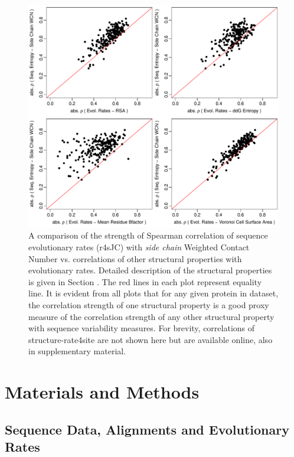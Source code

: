 \documentclass[11pt]{article}
\begin{document}
    \begin{figure}[tbh]
        \begin{center}
        \includegraphics[width=6.9in]{cordiv_similarities_r4sJC.pdf} %
        \end{center}
        \caption{A comparison of the strength of Spearman correlation of sequence evolutionary rates (r4sJC) with {\it side chain} Weighted Contact Number vs. correlations of other structural properties with evolutionary rates. Detailed description of the structural properties is given in Section \label{sec:mam}. The red lines in each plot represent equality line. It is evident from all plots that for any given protein in dataset, the correlation strength of one structural property is a good proxy measure of the correlation strength of any other structural property with sequence variability measures. For brevity, correlations of structure-rate4site are not shown here but are available online, also in supplementary material.}
        \label{fig:seqent_structure_cors}
    \end{figure}

\section{Materials and Methods}
\label{sec:mam}

    \subsection*{Sequence Data, Alignments and Evolutionary Rates}
\end{document}
